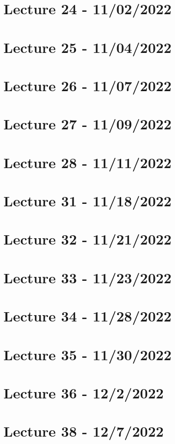 \documentclass{article}
\begin{document}



\section{Lecture 24 - 11/02/2022}

\section{Lecture 25 - 11/04/2022}

\section{Lecture 26 - 11/07/2022}

\section{Lecture 27 - 11/09/2022}

\section{Lecture 28 - 11/11/2022}






\section{Lecture 31 - 11/18/2022}

\section{Lecture 32 - 11/21/2022}

\section{Lecture 33 - 11/23/2022}

\section{Lecture 34 - 11/28/2022}

\section{Lecture 35 - 11/30/2022}

\section{Lecture 36 - 12/2/2022}



\section{Lecture 38 - 12/7/2022}
\end{document}
